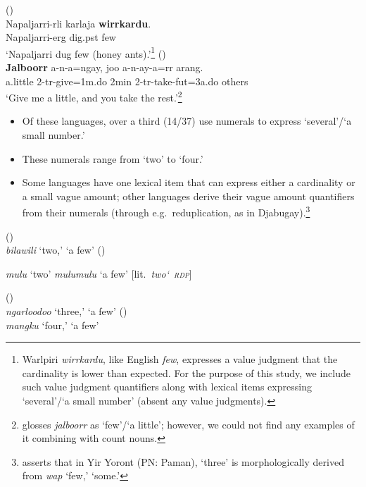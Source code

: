 \documentclass{article}
\begin{document}
\newpage
\begin{exe}
 (\citealt[9]{bowler17})\\
\gll Napaljarri-rli karlaja \textbf{wirrkardu}.\\
Napaljarri-{\sc erg} dig.{\sc pst} few\\
\glt `Napaljarri dug few (honey ants).'\footnote{Warlpiri \textit{wirrkardu}, like English \textit{few}, expresses a value judgment that the cardinality is lower than expected. For the purpose of this study, we include such value judgment quantifiers along with lexical items expressing `several'/`a small number' (absent any value judgments).}
 (\citealt[271]{bowern12})\\  
\gll \textbf{Jalboorr} a-n-a=ngay, joo a-n-ay-a=rr arang.\\
a.little 2-{\sc tr}-give=1{\sc m.do} 2{\sc min} 2-{\sc tr}-take-{\sc fut}=3{\sc a.do} others\\
\glt `Give me a little, and you take the rest.'\footnote{\cite{bowern12} glosses \textit{jalboorr} as `few'/`a little'; however, we could not find any examples of it combining with count nouns.}
\end{exe}

\begin{itemize}
    \item Of these languages, over a third (14/37) use numerals to express `several'/`a small number.' 
    \item These numerals range from `two'  to `four.'
    \item Some languages have one lexical item that can express either a cardinality or a small vague amount; other languages derive their vague amount quantifiers from their numerals (through e.g.\ reduplication, as in Djabugay).\footnote{\citet[51]{alpher73} asserts that in Yir Yoront (PN: Paman), \textit{} `three' is morphologically derived from \textit{wap} `few,' `some.'}
\end{itemize}

\begin{exe}
 (\citealt[9]{waters83})\\
{\it bilawili} `two,' `a few'
 (\citealt[87]{patz91})
\begin{xlist}
\ex \textit{mulu} `two'
\ex \textit{mulumulu} `a few' [lit.\ \textit{two\char`~\textsc{rdp}}]
\end{xlist}
 (\citealt[149]{mcgregor90})\\
\textit{ngarloodoo} `three,' `a few'
 (\citealt[27,82]{thompson88})\\
{\it mangku} `four,' `a few'
\end{exe}
\end{document}
